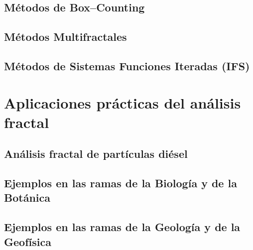 \subsection{Métodos de Box--Counting}
\subsection{Métodos Multifractales}
\subsection{Métodos de Sistemas Funciones Iteradas (IFS)}
\section{Aplicaciones prácticas del análisis fractal}
\subsection{Análisis fractal de partículas diésel}
\subsection{Ejemplos en las ramas de la Biología y de la Botánica}
\subsection{Ejemplos en las ramas de la Geología y de la Geofísica}


\newpage
	
